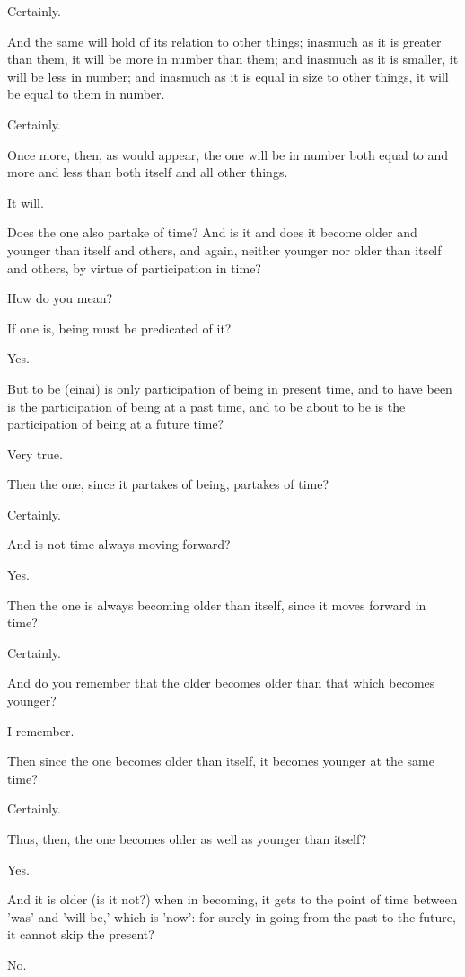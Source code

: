 Certainly.

And the same will hold of its relation to other things; inasmuch as it
is greater than them, it will be more in number than them; and inasmuch
as it is smaller, it will be less in number; and inasmuch as it is equal
in size to other things, it will be equal to them in number.

Certainly.

Once more, then, as would appear, the one will be in number both equal
to and more and less than both itself and all other things.

It will.

Does the one also partake of time? And is it and does it become older
and younger than itself and others, and again, neither younger nor older
than itself and others, by virtue of participation in time?

How do you mean?

If one is, being must be predicated of it?

Yes.

But to be (einai) is only participation of being in present time, and to
have been is the participation of being at a past time, and to be about
to be is the participation of being at a future time?

Very true.

Then the one, since it partakes of being, partakes of time?

Certainly.

And is not time always moving forward?

Yes.

Then the one is always becoming older than itself, since it moves
forward in time?

Certainly.

And do you remember that the older becomes older than that which becomes
younger?

I remember.

Then since the one becomes older than itself, it becomes younger at the
same time?

Certainly.

Thus, then, the one becomes older as well as younger than itself?

Yes.

And it is older (is it not?) when in becoming, it gets to the point of
time between 'was' and 'will be,' which is 'now': for surely in going
from the past to the future, it cannot skip the present?

No.

